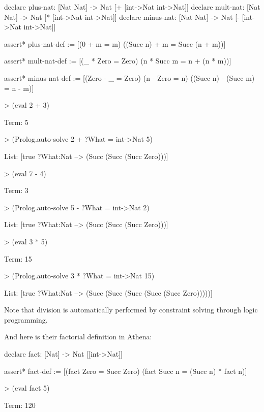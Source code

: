 \begin{tcAthena}
declare plus-nat:  [Nat Nat] -> Nat [+ [int->Nat int->Nat]]
declare mult-nat:  [Nat Nat] -> Nat [* [int->Nat int->Nat]]
declare minus-nat: [Nat Nat] -> Nat [- [int->Nat int->Nat]]

assert* plus-nat-def := [(0 + m = m)
                         ((Succ n) + m  = Succ (n + m))]

assert* mult-nat-def := [(_ * Zero = Zero)
                         (n * Succ m = n + (n * m))]

assert* minus-nat-def := [(Zero - _ = Zero)
                          (n - Zero = n)
                          ((Succ n) - (Succ m) = n - m)]

> (eval 2 + 3)

Term: 5

> (Prolog.auto-solve 2 + ?What = int->Nat 5)

List: [true {?What:Nat --> (Succ (Succ (Succ Zero)))}]

> (eval 7 - 4)

Term: 3

> (Prolog.auto-solve 5 - ?What = int->Nat 2)

List: [true {?What:Nat --> (Succ (Succ (Succ Zero)))}]

> (eval 3 * 5)

Term: 15

> (Prolog.auto-solve 3 * ?What = int->Nat 15)

List: [true {?What:Nat --> (Succ (Succ (Succ (Succ (Succ Zero)))))}]
\end{tcAthena}
Note that division is automatically performed by constraint solving through logic programming.

And here is their factorial definition in Athena:
\begin{tcAthena}
declare fact: [Nat] -> Nat [[int->Nat]]

assert* fact-def := [(fact Zero = Succ Zero)
                     (fact Succ n = (Succ n) * fact n)]

> (eval fact 5)

Term: 120
\end{tcAthena}

